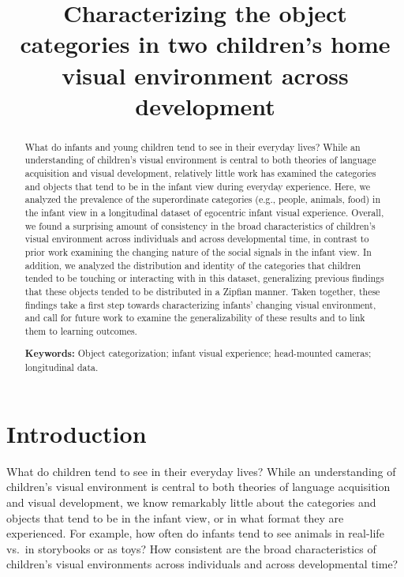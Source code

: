 \documentclass[10pt, letterpaper]{article}
\title{Characterizing the object categories in two children's home visual
environment across development}
\author{}
\begin{document}
\maketitle

\begin{abstract}
What do infants and young children tend to see in their everyday lives?
While an understanding of children's visual environment is central to
both theories of language acquisition and visual development, relatively
little work has examined the categories and objects that tend to be in
the infant view during everyday experience. Here, we analyzed the
prevalence of the superordinate categories (e.g., people, animals, food)
in the infant view in a longitudinal dataset of egocentric infant visual
experience. Overall, we found a surprising amount of consistency in the
broad characteristics of children's visual environment across
individuals and across developmental time, in contrast to prior work
examining the changing nature of the social signals in the infant view.
In addition, we analyzed the distribution and identity of the categories
that children tended to be touching or interacting with in this dataset,
generalizing previous findings that these objects tended to be
distributed in a Zipfian manner. Taken together, these findings take a
first step towards characterizing infants' changing visual environment,
and call for future work to examine the generalizability of these
results and to link them to learning outcomes.

\textbf{Keywords:}
Object categorization; infant visual experience; head-mounted cameras;
longitudinal data.
\end{abstract}

\hypertarget{introduction}{%
\section{Introduction}\label{introduction}}

What do children tend to see in their everyday lives? While an
understanding of children's visual environment is central to both
theories of language acquisition and visual development, we know
remarkably little about the categories and objects that tend to be in
the infant view, or in what format they are experienced. For example,
how often do infants tend to see animals in real-life vs.~in storybooks
or as toys? How consistent are the broad characteristics of children's
visual environments across individuals and across developmental time?
\end{document}
